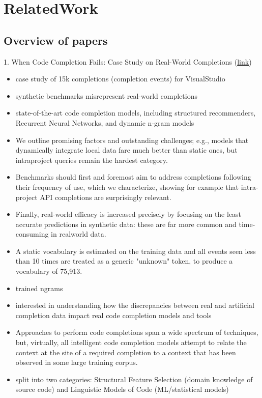 \chapter{RelatedWork}
\label{chap:RelatedWork}

\section{Overview of papers}
1. When Code Completion Fails: Case Study on
Real-World Completions (\href{https://ieeexplore.ieee.org/stamp/stamp.jsp?arnumber=8812116}{link})
\begin{itemize}
	\item case study of 15k completions (completion events) for VisualStudio
	\item synthetic benchmarks misrepresent real-world completions
	\item state-of-the-art code completion models, including structured recommenders, Recurrent Neural Networks, and dynamic n-gram models
    \item We outline promising factors and outstanding challenges; e.g., models that dynamically integrate local data fare much better than static ones, but intraproject queries remain the hardest category.
    \item Benchmarks should first and foremost aim to address completions following their frequency of use, which we characterize, showing for example that intra-project API completions are surprisingly relevant.
    \item Finally, real-world efficacy is increased precisely by focusing on the least accurate predictions in synthetic data: these are far more common and time-consuming in realworld data.
    \item A static vocabulary is estimated on the training data and all events seen less than 10 times are treated as a generic "unknown" token, to produce a vocabulary of 75,913.
    \item trained ngrams
    \item interested in understanding how the discrepancies between real and artificial completion data impact real code completion models and tools
    \item Approaches to perform code completions span a wide spectrum of techniques, but, virtually, all intelligent code completion models attempt to relate the context at the site of a required completion to a context that has been observed in some large training corpus.
    \item split into two categories: Structural Feature Selection (domain knowledge of source code) and Linguistic Models of Code (ML/statistical models)

\end{itemize}
